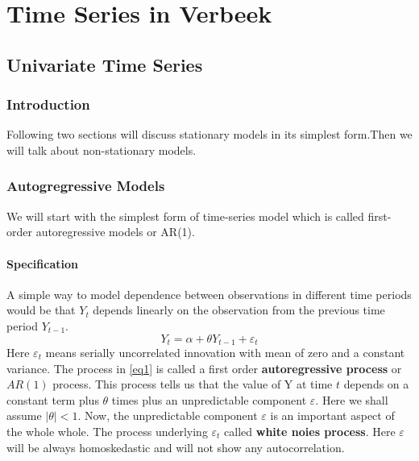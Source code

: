 \documentclass{book}
\begin{document}
\part{Time Series in Verbeek}
\chapter{Univariate Time Series}
\section{Introduction}
Following two sections will discuss stationary models in its simplest form.Then we will talk about non-stationary models. 
\section{Autogregressive Models}
We will start with the simplest form of time-series model which is called first-order autoregressive models or AR(1).
\subsection{Specification}
A simple way to model dependence between observations in different time periods would be that $Y_t$ depends linearly on the observation from the previous time period $Y_{t-1}$.
			\begin{equation}\label{eq1}
				Y_t=\alpha+\theta Y_{t-1}+\varepsilon_t
			\end{equation}
			Here $\varepsilon_t$ means serially uncorrelated innovation with mean of zero and a constant variance. The process in \eqref{eq1} is called a first order \textbf{autoregressive process} or 
			$AR(1)$ process. This process tells us that the value of Y at time $t$ depends on a constant term plus $\theta$ times plus an unpredictable component $\varepsilon$. Here we shall assume $|\theta|<1$. Now, the unpredictable component $\varepsilon$ is an important aspect of the whole whole. The process underlying $\varepsilon_t$  called \textbf{white noies process}. Here $\varepsilon$ will be always homoskedastic and will not show any autocorrelation. 
\end{document}
